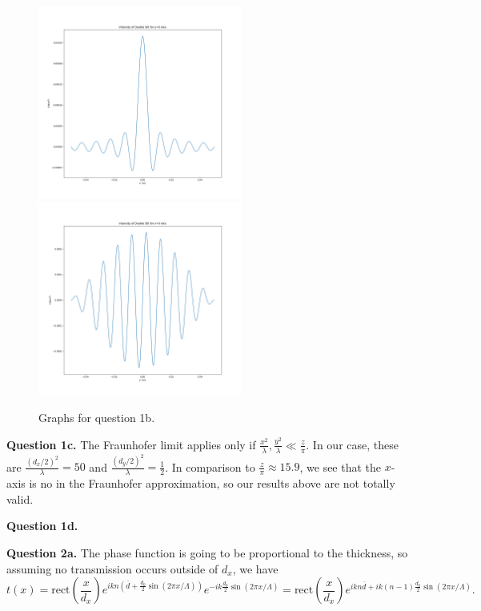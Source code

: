 \documentclass[letterpaper, reqno,11pt]{article}
\begin{document}
\begin{figure}[htpb]
    \centering
    \includegraphics[width=0.6\textwidth]{q1x}
    \includegraphics[width=0.6\textwidth]{q1y}
    \caption{Graphs for question 1b.}
    \label{fig:q1b}
\end{figure}

{\medskip\noindent\bf Question 1c.} The Fraunhofer limit applies only if $\frac{x^2}{\lambda}, \frac{y^2}{\lambda} \ll \frac{z}{\pi}$. In our case, these are $\frac{(d_x/2)^2}{\lambda}=50$ and $\frac{(d_y /2)^2}{\lambda}=\frac{1}{2}$. In comparison to $\frac{z}{\pi}\approx 15.9$, we see that the $x$-axis is no in the Fraunhofer approximation, so our results above are not totally valid.

{\medskip\noindent\bf Question 1d.} 



{\medskip\noindent\bf Question 2a.} The phase function is going to be proportional to the thickness, so assuming no transmission occurs outside of $d_x$, we have
\[
t(x) = \text{rect}\left(\frac{x}{d_x}\right)e^{ikn\left(\overline{d}+\frac{d_0}{2}\sin(2\pi x /\Lambda)\right)}e^{-ik \frac{d_0}{2}\sin\left( 2\pi x /\Lambda \right) }=\text{rect}\left(\frac{x}{d_x}\right)e^{ikn\overline{d}+ik(n-1)\frac{d_0}{2}\sin(2\pi x /\Lambda)}
.\]
\end{document}
